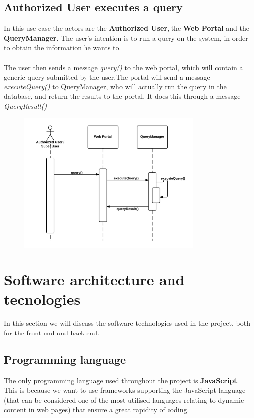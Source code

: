 \subsection{Authorized User executes a query}

In this use case the actors are the \textbf{Authorized User}, the \textbf{Web Portal} and the \textbf{QueryManager}. 
The user's intention is to run a query on the system, in order to obtain the information he wants to.\\
\\The user then sends a message \emph{query()} to the web portal, which will contain a generic query submitted by the user.The portal will send a message \emph{executeQuery()} to QueryManager, who will actually run the query in the database, and return the results to the portal. It does this through a message \emph{QueryResult()}

\begin{figure}[ht!]
	\centering
	\includegraphics[width=90mm]{../Slides/images/Presentation_short_SSD_4.png}
	\label{overflow}
	\end{figure}

\section{Software architecture and tecnologies}
In this section we will discuss the software technologies used in the project, both for the front-end and back-end.
\subsection{Programming language}
The only programming language used throughout the project is \textbf{JavaScript}. This is because we want to use frameworks  supporting the JavaScript language (that can be considered one of the most utilised languages relating to dynamic content in web pages) that ensure a great rapidity of coding.

